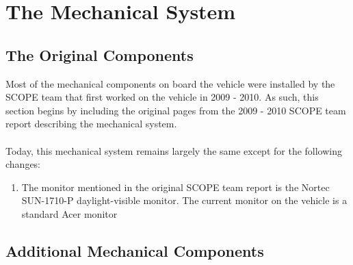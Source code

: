 \section{The Mechanical System}

\subsection{The Original Components}
Most of the mechanical components on board the vehicle were installed by the SCOPE team that first worked on the vehicle in 2009 - 2010. As such, this section begins by including the original pages from the 2009 - 2010 SCOPE team report describing the mechanical system. \\ \\
%
Today, this mechanical system remains largely the same except for the following changes:

\begin{enumerate}
\item The monitor mentioned in the original SCOPE team report is the Nortec SUN-1710-P daylight-visible monitor. The current monitor on the vehicle is a standard Acer monitor
\end{enumerate}

\newpage



\newpage

\subsection{Additional Mechanical Components}